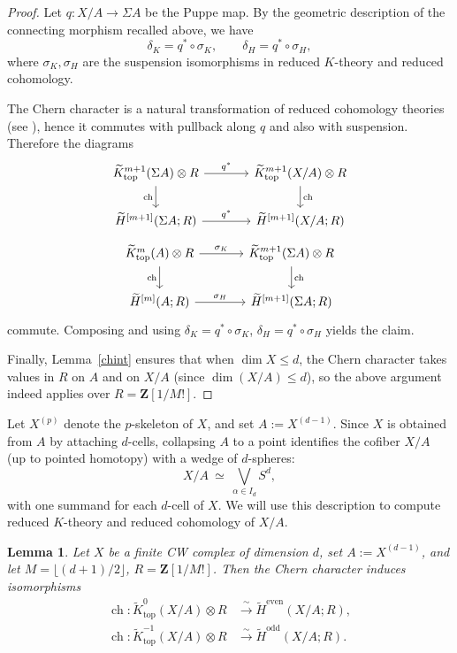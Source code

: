 \documentclass[11pt]{amsart}
\newtheorem{lemma}{Lemma}[section]
\numberwithin{equation}{section}
\newcommand{\ch}{{\operatorname{ch}}}
\newcommand{\topp}{{\operatorname{top}}}
\numberwithin{equation}{section}
\begin{document}
\begin{proof}
Let $q\colon X/A\to \Sigma A$ be the Puppe map. By the geometric description of the connecting morphism recalled above,
we have
\[
\delta_K=q^*\circ \sigma_K,\qquad \delta_H=q^*\circ \sigma_H,
\]
where $\sigma_K,\sigma_H$ are the suspension isomorphisms in reduced $K$-theory and reduced cohomology.

The Chern character is a natural transformation of reduced cohomology theories (see \cite[\S2--\S3]{AH61}),
hence it commutes with pullback along $q$ and also with suspension. Therefore the diagrams
\[
\begin{tikzcd}[column sep=large]
\widetilde{K}_{\topp}^{m+1}(\Sigma A)\otimes R \ar[r,"q^*"] \ar[d,"\ch"'] &
\widetilde{K}_{\topp}^{m+1}(X/A)\otimes R \ar[d,"\ch"] \\
\widetilde H^{[m+1]}(\Sigma A;R) \ar[r,"q^*"] &
\widetilde H^{[m+1]}(X/A;R)
\end{tikzcd}
\]
\[
\begin{tikzcd}[column sep=large]
\widetilde{K}_{\topp}^{m}(A)\otimes R \ar[r,"\sigma_K"] \ar[d,"\ch"'] &
\widetilde{K}_{\topp}^{m+1}(\Sigma A)\otimes R \ar[d,"\ch"] \\
\widetilde H^{[m]}(A;R) \ar[r,"\sigma_H"] &
\widetilde H^{[m+1]}(\Sigma A;R)
\end{tikzcd}
\]
commute. Composing and using $\delta_K=q^*\circ\sigma_K$, $\delta_H=q^*\circ\sigma_H$ yields the claim.

Finally, Lemma~\ref{chint} ensures that when $\dim X\le d$, the Chern character takes values
in $R$ on $A$ and on $X/A$ (since $\dim(X/A)\le d$), so the above argument indeed applies over $R=\mathbf{Z}[1/M!]$.
\end{proof}


Let $X^{(p)}$ denote the $p$-skeleton of $X$, and set $A:=X^{(d-1)}$.
Since $X$ is obtained from $A$ by attaching $d$-cells, collapsing $A$ to a point identifies the cofiber $X/A$
(up to pointed homotopy) with a wedge of $d$-spheres:
\[
X/A\ \simeq\ \bigvee_{\alpha\in I_d} S^d,
\]
with one summand for each $d$-cell of $X$. We will use this description to compute reduced $K$-theory and reduced
cohomology of $X/A$.

\begin{lemma}\label{cofibch}
Let $X$ be a finite CW complex of dimension $d$, set $A:=X^{(d-1)}$, and let
$M=\lfloor(d+1)/2\rfloor$, $R=\mathbf{Z}[1/M!]$.
Then the Chern character induces isomorphisms
\[
\begin{aligned}
\ch\colon \widetilde{K}_{\topp}^{0}(X/A)\otimes R &\xrightarrow{\ \sim\ } \widetilde H^{\mathrm{even}}(X/A;R),\\
\ch\colon \widetilde{K}_{\topp}^{-1}(X/A)\otimes R &\xrightarrow{\ \sim\ } \widetilde H^{\mathrm{odd}}(X/A;R).
\end{aligned}
\]
\end{lemma}
\end{document}
